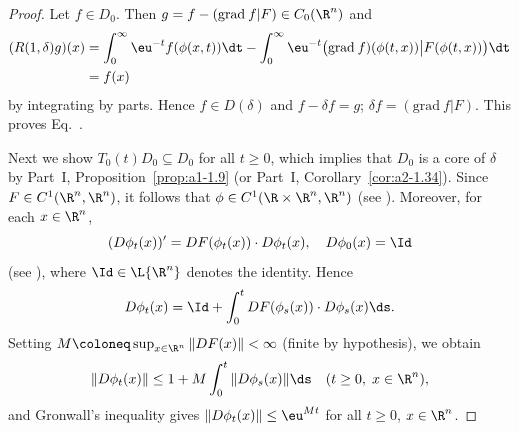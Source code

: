 \begin{proof}
Let $f \in D_{0}$.
Then $g = f - (\mathrm{grad}\: f | F) \in C_{0}(\R^{n})$ and
\begin{equation*}
\begin{split}
(R(1,\delta)g)(x) 
&= \int_{0}^{\infty} \eu^{-t}f(\phi(x,t)) \dt - \int_{0}^{\infty} 
\eu^{-t}\big(\mathrm{grad}\: f)(\phi(t,x)) \big| F(\phi(t,x))\big) \dt \\
&= f(x)
\end{split}
\end{equation*}
 by integrating by parts.
Hence $f \in D(\delta)$ and $f - \delta f = g$; \ie $\delta f = (\mathrm{grad}\: f|F)$.
This proves Eq.~.


Next we show $T_{0}(t)D_{0} \subseteq D_{0}$ for all $t \geq 0$, which implies that $D_{0}$
is a core of\/ $\delta$ by Part~I, Proposition~\ref{prop:a1-1.9}
(or Part~I, Corollary~\ref{cor:a2-1.34}).
Since $F \in C^{1}(\R^{n},\R^{n})$, it follows that
$\phi \in C^{1}(\R \times \R^{n},\R^{n})$
(see \eg \textcite[15.2]{hirschsmale:1974}).
Moreover, for each $x \in \R^{n}$,
\[
    (D\phi_{t}(x))' = DF(\phi_{t}(x)) \cdot D\phi_{t}(x), \quad D\phi_{0}(x) = \Id
\]
(see \textcite[p.\,300]{hirschsmale:1974}), where $\Id \in \L{\R^{n}}$ denotes the identity.
Hence
\[
    D\phi_{t}(x) = \Id + \int_{0}^{t} DF(\phi_{s}(x)) \cdot D\phi_{s}(x) \ds.
\]
Setting $M \coloneq \sup_{x \in \R^{n}} \|DF(x)\| < \infty$ (finite by hypothesis),
we obtain
\[
    \|D\phi_{t}(x)\| \leq 1 + M\int_{0}^{t} \|D\phi_{s}(x)\| \ds
    \quad (t \geq 0,\; x \in \R^{n}),
\]
and Gronwall's inequality gives $\|D\phi_{t}(x)\| \leq \eu^{Mt}$ for all $t \geq 0$,
$x \in \R^{n}$.


\end{proof}
